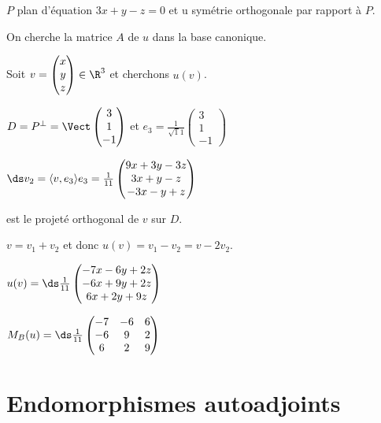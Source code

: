 \begin{exemple}
    $P$ plan d'équation $3x + y - z = 0$ et u symétrie orthogonale par rapport à $P$.

    On cherche la matrice $A$ de $u$ dans la base canonique. 

    Soit $v = \begin{pmatrix}
        x \\ y \\ z
    \end{pmatrix} \in \R^3$ et cherchons $u(v)$. 

    $D = P^\perp = \Vect \begin{pmatrix}
        3 \\ 1 \\ -1
    \end{pmatrix}$ et $e_3 = \frac 1 {\sqrt 11} \begin{pmatrix}
        3 \\ 1 \\ -1
    \end{pmatrix}$

    $\ds v_2 = \langle v, e_3 \rangle e_3 = \frac 1 {11} \begin{pmatrix}
        9x + 3y - 3z \\ 3x + y - z \\ -3x - y + z
    \end{pmatrix}$

    est le projeté orthogonal de $v$ sur $D$. 

    $v = v_1 + v_2$ et donc $u(v) = v_1 - v_2 = v - 2 v_2$.

    $u(v) = \ds \frac 1 {11} \begin{pmatrix}
        -7 x - 6y + 2z \\
        -6x + 9y + 2z \\
        6x + 2y + 9z
    \end{pmatrix}$

    $M_B (u) = \ds \frac 1 {11} \begin{pmatrix}
        -7 & -6 & 6 \\
        -6 & 9 & 2 \\
        6 & 2 & 9
    \end{pmatrix}$
\end{exemple}

\section{Endomorphismes autoadjoints}

